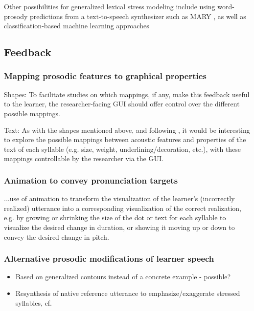 	 Other possibilities for generalized lexical stress modeling include using word-prosody predictions from a text-to-speech synthesizer such as MARY \citep{Schroeder2003}, as well as 
classification-based machine learning approaches 


	\subsection{Feedback}
	
	\subsubsection{Mapping prosodic features to graphical properties}
	Shapes: To facilitate studies on which mappings, if any, make this feedback useful to the learner, the researcher-facing GUI should offer control over the different possible mappings.
	
	Text: As with the shapes mentioned above, and following \textcite{Sitaram2011}, it would be interesting to explore the possible mappings between acoustic features and properties of the text of each syllable (e.g. size, weight, underlining/decoration, etc.), with these mappings controllable by the researcher via the GUI.
	
	\subsubsection{Animation to convey pronunciation targets}
	...use of animation to transform the visualization of the learner's (incorrectly realized) utterance into a corresponding visualization of the correct realization, e.g. by growing or shrinking the size of the dot or text for each syllable to visualize the desired change in duration, or showing it moving up or down to convey the desired change in pitch.
	
	\subsubsection{Alternative prosodic modifications of learner speech}
	
	\begin{itemize}
	\item{Based on generalized contours instead of a concrete example - possible?}
	\item{Resynthesis of native reference utterance to emphasize/exaggerate stressed syllables, cf. \citep{Bissiri2006,Bissiri2009}}
	\end{itemize}